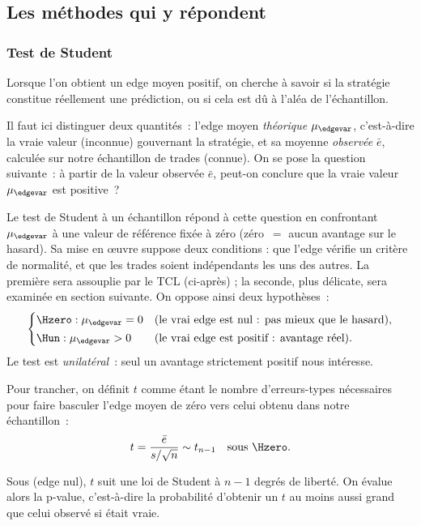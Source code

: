 \subsection{Les méthodes qui y répondent}

\subsubsection*{Test de Student}

Lorsque l'on obtient un edge moyen positif, on cherche à savoir si la
stratégie constitue réellement une prédiction, ou si cela est dû à l'aléa
de l'échantillon.

Il faut ici distinguer deux quantités~: l'edge moyen
\emph{théorique} \(\mu_{\edgevar}\), c'est-à-dire la vraie valeur (inconnue)
gouvernant la stratégie, et sa moyenne
\emph{observée} \(\bar e\), calculée sur notre échantillon de trades
(connue). On se pose la question suivante~: à partir de la valeur observée
\(\bar e\), peut-on conclure que la vraie valeur \(\mu_{\edgevar}\) est
positive~?

Le test de Student à un échantillon répond à cette question en confrontant
\(\mu_{\edgevar}\) à une valeur de référence fixée à zéro (zéro~$=$ aucun
avantage sur le hasard). Sa mise en \oe uvre suppose deux conditions : que l'edge
vérifie un critère de normalité, et que les trades soient indépendants les uns des autres.
La première sera assouplie par le TCL (ci-après) ; 
la seconde, plus délicate, sera examinée en section suivante. On oppose ainsi deux
hypothèses~:
\[
  \begin{cases}
    \Hzero : \mu_{\edgevar} = 0 & \text{(le vrai edge est nul : pas mieux que le hasard),}\\[2pt]
    \Hun : \mu_{\edgevar} > 0 & \text{(le vrai edge est positif : avantage réel).}
  \end{cases}
\]
Le test est \emph{unilatéral}~: seul un avantage strictement positif nous
intéresse.

Pour trancher, on définit \(t\) comme étant le nombre d'erreurs-types
nécessaires pour faire basculer l'edge moyen de zéro vers celui obtenu
dans notre échantillon~:
\[
  t = \frac{\bar e}{s/\sqrt{n}} \sim t_{n-1} \quad\text{sous } \Hzero .
\]

Sous \Hzero{} (edge nul), \(t\) suit une loi de Student à \(n-1\) degrés
de liberté. On évalue alors la p-value, c'est-à-dire la probabilité
d'obtenir un \(t\) au moins aussi grand que celui observé si \Hzero{}
était vraie.

